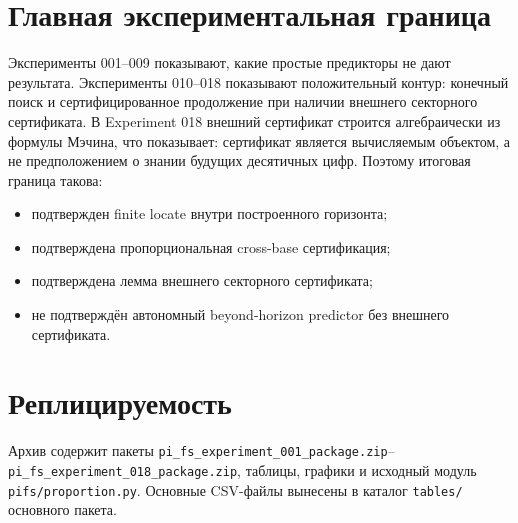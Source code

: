 \documentclass[11pt,a4paper]{article}
\begin{document}
\section*{Главная экспериментальная граница}
Эксперименты 001--009 показывают, какие простые предикторы не дают результата.  Эксперименты 010--018 показывают положительный контур: конечный поиск и сертифицированное продолжение при наличии внешнего секторного сертификата.  В Experiment 018 внешний сертификат строится алгебраически из формулы Мэчина, что показывает: сертификат является вычисляемым объектом, а не предположением о знании будущих десятичных цифр.  Поэтому итоговая граница такова:
\begin{itemize}
\item подтвержден finite locate внутри построенного горизонта;
\item подтверждена пропорциональная cross-base сертификация;
\item подтверждена лемма внешнего секторного сертификата;
\item не подтверждён автономный beyond-horizon predictor без внешнего сертификата.
\end{itemize}

\section*{Реплицируемость}
Архив содержит пакеты \texttt{pi\_fs\_experiment\_001\_package.zip}--\texttt{pi\_fs\_experiment\_018\_package.zip}, таблицы, графики и исходный модуль \texttt{pifs/proportion.py}.  Основные CSV-файлы вынесены в каталог \texttt{tables/} основного пакета.
\end{document}
